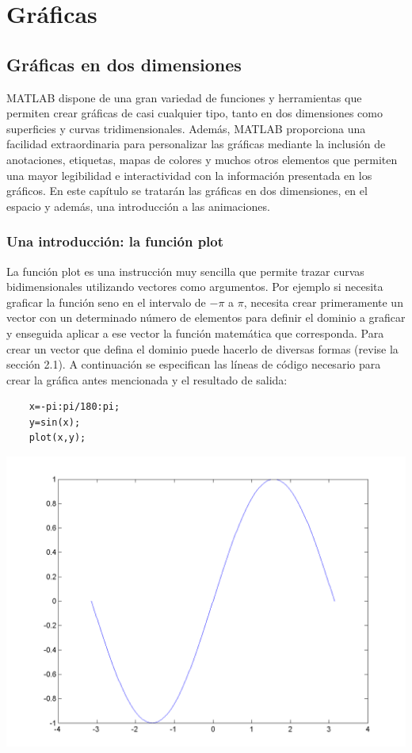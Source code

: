 \chapter{Gráficas}

\section{Gráficas en dos dimensiones}

MATLAB dispone de una gran variedad de funciones y herramientas que permiten crear gráficas de casi 
cualquier tipo, tanto en dos dimensiones como superficies y curvas tridimensionales. Además, MATLAB 
proporciona una facilidad extraordinaria para personalizar las gráficas mediante la inclusión de 
anotaciones, etiquetas, mapas de colores y muchos otros elementos que permiten una mayor legibilidad 
e interactividad con la información presentada en los gráficos. En este capítulo se tratarán las 
gráficas en dos dimensiones, en el espacio y además, una introducción a las animaciones.

\subsection{Una introducción: la función plot}

La función plot es una instrucción muy sencilla que permite trazar curvas bidimensionales utilizando 
vectores como argumentos. Por ejemplo si necesita graficar la función seno en el intervalo de $-\pi$ a $\pi$, 
necesita crear primeramente un vector con un determinado número de elementos para definir el dominio a 
graficar y enseguida aplicar a ese vector la función matemática que corresponda. Para crear un vector que 
defina el dominio puede hacerlo de diversas formas (revise la sección 2.1). A continuación se especifican 
las líneas de código necesario para crear la gráfica antes mencionada y el resultado de salida:

\begin{verbatim}
	x=-pi:pi/180:pi;
	y=sin(x);
	plot(x,y);
\end{verbatim}

\begin{center}
\includegraphics[scale=0.6]{src/ch4/img_4_1.png}
\end{center}

